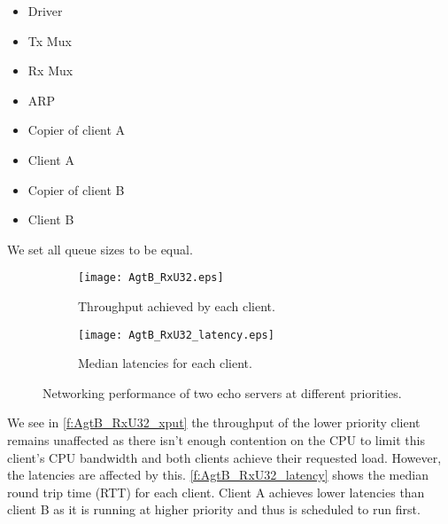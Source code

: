 \begin{minipage}{\textwidth}
\begin{itemize}
    \item[7.] Driver
    \item[6.] Tx Mux
    \item[5.] Rx Mux
    \item[4.] ARP
    \item[4.] Copier of client A
    \item[3.] Client A
    \item[2.] Copier of client B
    \item[1.] Client B
\end{itemize}

\end{minipage}

We set all queue sizes to be equal. 

\noindent\begin{figure}[H]
    \centering
	\begin{multicols}{2}
		\begin{subfigure}[b]{0.45\textwidth}
        \centering
        \texttt{[image: AgtB\_RxU32.eps]}
        \caption{Throughput achieved by each client.}
        \label{f:AgtB_RxU32_xput}
    \end{subfigure}\qquad
    \begin{subfigure}[b]{0.45\textwidth}
        \vspace{39pt}
        \centering
        \texttt{[image: AgtB\_RxU32\_latency.eps]}
        \caption{Median latencies for each client.}
        \label{f:AgtB_RxU32_latency}
    \end{subfigure}
\end{multicols}
\caption{Networking performance of two echo servers at different priorities.}
\label{f:AgtB_RxU32}
\end{figure}

We see in \autoref{f:AgtB_RxU32_xput} the throughput of the lower priority client remains unaffected as there isn't enough
contention on the CPU to limit this client's CPU bandwidth and both clients achieve their requested load.
However, the latencies are affected by this. \autoref{f:AgtB_RxU32_latency} shows the median round trip time (RTT)
for each client. Client A achieves lower latencies than client B as it is running
at higher priority and thus is scheduled to run first.

